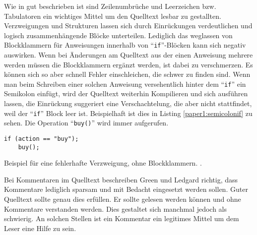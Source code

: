 Wie in \cite[S. 3, 6-8]{Green} gut beschrieben ist sind Zeilenumbrüche und Leerzeichen bzw. Tabulatoren ein wichtiges Mittel um den Quelltext lesbar zu gestallten. Verzweigungen und Strukturen lassen sich durch Einrückungen verdeutlichen und logisch zusammenhängende Blöcke unterteilen. Lediglich das weglassen von Blockklammern für Anweisungen innerhalb von \enquote{\texttt{if}}-Blöcken kann sich negativ auswirken. Wenn bei Änderungen am Quelltext aus der einen Anweisung mehrere werden müssen die Blockklammern ergänzt werden, ist dabei zu verschmerzen. Es können sich so aber schnell Fehler einschleichen, die schwer zu finden sind. Wenn man beim Schreiben einer solchen  Anweisung versehentlich hinter dem \enquote{\texttt{if}} ein Semikolon einfügt, wird der Quelltext weiterhin Kompilieren und sich ausführen lassen, die Einrückung suggeriert eine Verschachtelung, die aber nicht stattfindet, weil der \enquote{\texttt{if}} Block leer ist. Beispielhaft ist dies in Listing \ref{paper1:semicolonif} zu sehen. Die Operation \enquote{\texttt{buy()}} wird immer aufgerufen.

\begin{listing}[H]
    \begin{verbatim}
if (action == "buy");
    buy();
    \end{verbatim}
    \label{paper1:semicolonif}
    \caption{Beispiel für eine fehlerhafte Verzweigung, ohne Blockklammern. \cite[S. 8]{Green}.}
\end{listing}

Bei Kommentaren im Quelltext beschreiben Green  und Ledgard richtig, dass Kommentare lediglich sparsam und mit Bedacht eingesetzt werden sollen\cite[S. 9]{Green}. Guter Quelltext sollte genau dies erfüllen. Er sollte gelesen werden können und ohne Kommentare verstanden werden. Dies gestaltet sich manchmal jedoch als schwierig. An solchen Stellen ist ein Kommentar ein legitimes Mittel um dem Leser eine Hilfe zu sein.

